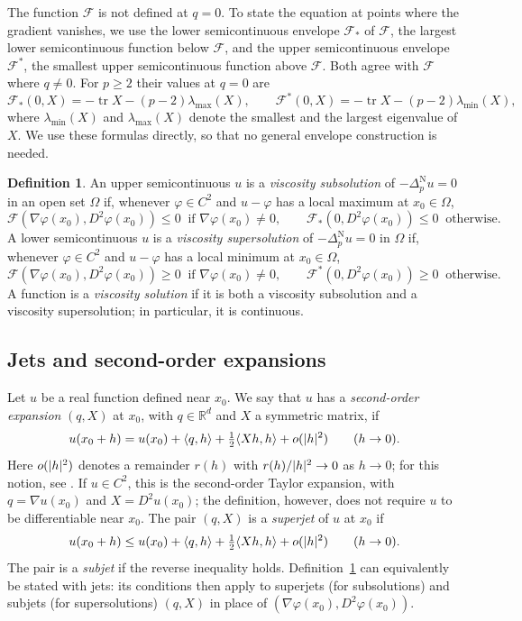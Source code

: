 \documentclass[11pt,reqno]{amsart}
\newcommand{\R}{\mathbb{R}}
\newcommand{\pnlap}{\Delta_p^{\mathrm{N}}}       %
\newcommand{\Fop}{\mathcal{F}}                   %
\DeclarePairedDelimiter{\abs}{\lvert}{\rvert}
\theoremstyle{plain}
\theoremstyle{definition}
\newtheorem{definition}[theorem]{Definition}
\theoremstyle{remark}
\begin{document}
The function $\Fop$ is not defined at $q = 0$. To state the equation at points
where the gradient vanishes, we use the lower semicontinuous envelope
$\Fop_*$ of $\Fop$, the largest lower semicontinuous function below $\Fop$,
and the upper semicontinuous envelope $\Fop^*$, the smallest upper
semicontinuous function above $\Fop$. Both agree with $\Fop$ where $q \ne 0$.
For $p \ge 2$ their values at $q = 0$ are
\begin{equation}\label{eq:env}
  \Fop_*(0,X) = -\operatorname{tr}X - (p-2)\lambda_{\max}(X), \qquad
  \Fop^*(0,X) = -\operatorname{tr}X - (p-2)\lambda_{\min}(X),
\end{equation}
where $\lambda_{\min}(X)$ and $\lambda_{\max}(X)$ denote the smallest and the
largest eigenvalue of $X$. We use these formulas directly, so that no general
envelope construction is needed.

\begin{definition}\label{def:visc}
An upper semicontinuous $u$ is a \emph{viscosity subsolution} of
$-\pnlap u = 0$ in an open set $\Omega$ if, whenever $\varphi \in C^2$ and
$u - \varphi$ has a local maximum at $x_0 \in \Omega$,
\[
  \Fop(\nabla\varphi(x_0), D^2\varphi(x_0)) \le 0 \ \text{ if } \nabla\varphi(x_0)
  \ne 0, \qquad \Fop_*(0, D^2\varphi(x_0)) \le 0 \ \text{ otherwise}.
\]
A lower semicontinuous $u$ is a \emph{viscosity supersolution} of
$-\pnlap u = 0$ in $\Omega$ if, whenever $\varphi \in C^2$ and $u - \varphi$
has a local minimum at $x_0 \in \Omega$,
\[
  \Fop(\nabla\varphi(x_0), D^2\varphi(x_0)) \ge 0 \ \text{ if } \nabla\varphi(x_0)
  \ne 0, \qquad \Fop^*(0, D^2\varphi(x_0)) \ge 0 \ \text{ otherwise}.
\]
A function is a \emph{viscosity solution} if it is both a viscosity
subsolution and a viscosity supersolution; in particular, it is continuous.
\end{definition}

\subsection{Jets and second-order expansions}
Let $u$ be a real function defined near $x_0$. We say that $u$ has a
\emph{second-order expansion} $(q, X)$ at $x_0$, with $q \in \R^d$ and
$X$ a symmetric matrix, if
\[
  u(x_0 + h) = u(x_0) + \langle q, h\rangle + \tfrac12\langle Xh, h\rangle
  + o(\abs h^2) \qquad (h \to 0).
\]
Here $o(\abs h^2)$ denotes a remainder $r(h)$ with $r(h)/\abs h^2 \to 0$ as
$h \to 0$; for this notion, see \cite[Section~6.4]{EG15}. If $u \in C^2$, this is the second-order Taylor expansion, with
$q = \nabla u(x_0)$ and $X = D^2u(x_0)$; the definition, however, does not
require $u$ to be differentiable near $x_0$. The pair $(q, X)$ is a
\emph{superjet} of $u$ at $x_0$ if
\[
  u(x_0+h) \le u(x_0)+\langle q,h\rangle
    +\tfrac12\langle Xh,h\rangle+o(\abs h^2)
  \qquad (h\to0).
\]
The pair is a \emph{subjet} if the reverse inequality holds.
Definition~\ref{def:visc} can equivalently
be stated with jets: its conditions then apply to superjets (for
subsolutions) and subjets (for supersolutions) $(q, X)$ in place of
$(\nabla\varphi(x_0), D^2\varphi(x_0))$.
\end{document}
